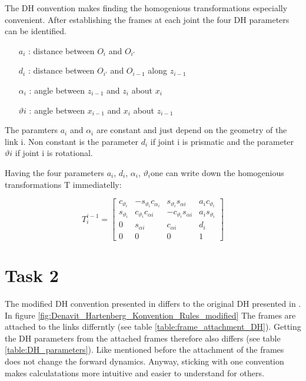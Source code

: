 \documentclass{tpk4170report}
\begin{document}
The DH convention makes finding the homogenious transformations especially convenient. After establishing the frames at each joint the four DH parameters can be identified. 

\begin{itemize}
  \item[\(a_{i}\)]: distance between \(O_{i}\) and \(O_{i'}\) 
  \item[\(d_{i}\)]: distance between \(O_{i'}\) and \(O_{i-1}\) along \(z_{i-1}\)
  \item[\(\alpha_{i}\)]: angle between \(z_{i-1}\) and \(z_{i}\) about \(x_{i}\)
  \item[\(\vartheta{i}\)]:  angle between \(x_{i-1}\) and \(x_{i}\) about \(z_{i-1}\)
\end{itemize}

The paramters \(a_{i}\) and \(\alpha_{i}\) are constant and just depend on the geometry of the link i. Non constant is the parameter \(d_{i}\) if joint i is prismatic and the parameter \(\vartheta{i}\) if joint i is rotational.

Having the four parameters \(a_{i}\), \(d_{i}\), \(\alpha_{i}\), \(\vartheta_{i}\)one can write down the homogenious transformations T immediatelly: 

\begin{equation}
  T_{i}^{i-1}= 
  \begin{bmatrix}
    c_{\vartheta_{i}} & -s_{\vartheta_{i}}c_{\alpha_{i}} &  s_{\vartheta_{i}}s_{\alpha{i}} & a_{i}c_{\vartheta_{i}} \\
    s_{\vartheta_{i}} & c_{\vartheta_{i}}c_{\alpha{i}} & -c_{\vartheta_{i}}s_{\alpha{i}} & a_{i}s_{\vartheta_{i}} \\
    0 & s_{\alpha{i}} & c_{\alpha{i}} & d_{i} \\
    0 & 0 & 0 & 1
  \end{bmatrix}
  \label{eqn:Transformation_Denavit_Hartenberg}
\end{equation}
\cite{Siciliano2009}

\section{Task 2}
The modified DH convention presented in \cite{Lynch2017} differs to the original DH presented in \cite{Siciliano2009}. In figure \ref{fig:Denavit_Hartenberg_Konvention_Rules_modified} The frames are attached to the links differntly (see table \ref{table:frame_attachment_DH}). Getting the DH parameters from the attached frames therefore also differs (see table \ref{table:DH_parameters}). Like mentioned before the attachment of the frames does not change the forward dynamics. Anyway, sticking with one convention makes calculatations more intuitive and easier to understand for others.
\end{document}

